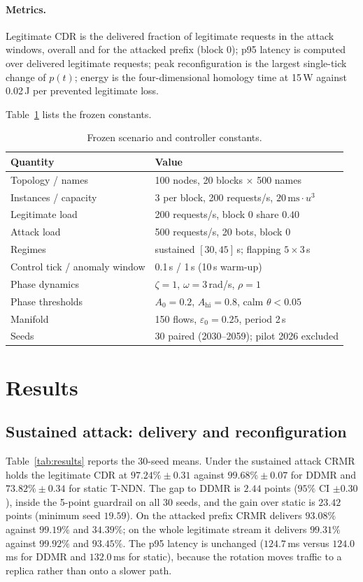 \documentclass[10pt,a4paper]{article}
\begin{document}
\paragraph{Metrics.}
Legitimate CDR is the delivered fraction of legitimate requests in the attack
windows, overall and for the attacked prefix (block 0); p95 latency is computed
over delivered legitimate requests; peak reconfiguration is the largest
single-tick change of $p(t)$; energy is the four-dimensional homology time at
15\,W against 0.02\,J per prevented legitimate loss.

Table~\ref{tab:params} lists the frozen constants.

\begin{table}[t]
\centering
\small
\caption{Frozen scenario and controller constants.}
\label{tab:params}
\begin{tabular}{@{}ll@{}}
\toprule
Quantity & Value \\
\midrule
Topology / names & 100 nodes, 20 blocks $\times$ 500 names \\
Instances / capacity & 3 per block, 200 requests/s, $20\,\mathrm{ms}\cdot u^3$ \\
Legitimate load & 200 requests/s, block 0 share $0.40$ \\
Attack load & 500 requests/s, 20 bots, block 0 \\
Regimes & sustained $[30,45]$\,s; flapping $5\times3$\,s \\
Control tick / anomaly window & 0.1\,s / 1\,s (10\,s warm-up) \\
Phase dynamics & $\zeta=1$, $\omega=3$\,rad/s, $\rho=1$ \\
Phase thresholds & $A_0=0.2$, $A_{\mathrm{hi}}=0.8$, calm $\theta<0.05$ \\
Manifold & 150 flows, $\varepsilon_0=0.25$, period 2\,s \\
Seeds & 30 paired (2030--2059); pilot 2026 excluded \\
\bottomrule
\end{tabular}
\end{table}

\section{Results}
\label{sec:results}

\subsection{Sustained attack: delivery and reconfiguration}
Table~\ref{tab:results} reports the 30-seed means. Under the sustained attack CRMR
holds the legitimate CDR at $97.24\%\pm0.31$ against $99.68\%\pm0.07$ for DDMR and
$73.82\%\pm0.34$ for static T-NDN. The gap to DDMR is $2.44$ points
($95\%$ CI $\pm0.30$), inside the 5-point guardrail on all 30 seeds, and the gain
over static is $23.42$ points (minimum seed $19.59$). On the attacked prefix CRMR
delivers $93.08\%$ against $99.19\%$ and $34.39\%$; on the whole legitimate stream
it delivers $99.31\%$ against $99.92\%$ and $93.45\%$. The p95 latency is
unchanged ($124.7$\,ms versus $124.0$\,ms for DDMR and $132.0$\,ms for static),
because the rotation moves traffic to a replica rather than onto a slower path.
\end{document}
